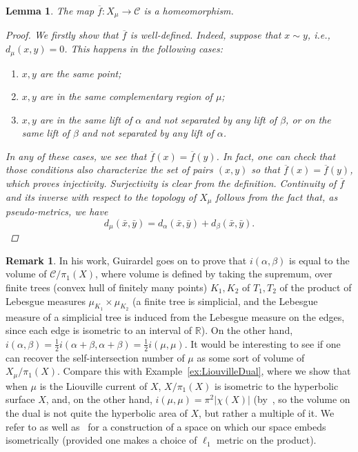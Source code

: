 \documentclass[12pt,article]{amsart}
\numberwithin{equation}{section}
\numberwithin{figure}{section}
\newtheorem{lemma}[equation]{Lemma}
\theoremstyle{definition}
\newtheorem{remark}[equation]{Remark}
\theoremstyle{plain}
\begin{document}
\begin{lemma}
    The map $\overline{f} : X_\mu \to \mathcal{C}$ is a homeomorphism. 
    \begin{proof}
        We firstly show that $\overline{f}$ is well-defined.
Indeed, suppose that $x \sim y$, i.e., $d_{\mu}(x,y)=0$.
This happens in the following cases:
\begin{enumerate}
\item $x,y$ are the same point;
\item $x,y$ are in the same complementary region of $\mu$;
\item $x,y$ are in the same lift of $\alpha$ and not separated by any lift of $\beta$, or on the same lift of $\beta$ and not separated by any lift of $\alpha$.
\end{enumerate}
In any of these cases, we see that $\overline{f}(x)=\overline{f}(y)$. 
In fact, one can check that those conditions also characterize the set of pairs $(x,y)$ so that $\overline{f}(x)=\overline{f}(y)$, which proves injectivity. Surjectivity is clear from the definition. Continuity of 
$\overline{f}$ and its inverse with respect to the topology of $X_{\mu}$ follows from the fact that, as pseudo-metrics, we have
\[
d_{\mu}(\bar{x},\bar{y})=d_{\alpha}(\bar{x},\bar{y}) + d_{\beta}(\bar{x},\bar{y}).
\]
    \end{proof}
\end{lemma}




\begin{remark}
In his work, Guirardel goes on to prove that $i(\alpha,\beta)$ is equal to the volume of $\mathcal{C}/\pi_1(X)$, where volume is defined by taking the supremum, over finite trees (convex hull of finitely many points) $K_1,K_2$ of $T_1,T_2$ of the product of Lebesgue measures $\mu_{K_1} \times \mu_{K_2}$ (a finite tree is simplicial, and the Lebesgue measure of a simplicial tree is induced from the Lebesgue measure on the edges, since each edge is isometric to an interval of $\mathbb{R}$). On the other hand, $i(\alpha,\beta)=\frac{1}{2}i(\alpha + \beta, \alpha + \beta)=\frac{1}{2} i(\mu,\mu)$. It would be interesting to see if one can recover the self-intersection number of $\mu$ as some sort of volume of $X_{\mu}/\pi_1(X)$. Compare this with Example~\ref{ex:LiouvilleDual}, where we show that when $\mu$ is the Liouville current of $X$, $X/\pi_1(X)$ is isometric to the hyperbolic surface $X$, and, on the other hand, $i(\mu,\mu)=\pi^2 |\chi(X)|$ (by~\cite[Proposition~15]{Bonahon88:GeodesicCurrent}, so the volume on the dual is not quite the hyperbolic area of $X$, but rather a multiple of it.
We refer to \cite[Definition~3.4]{BIPP21:PSL2xPSL2} as well as~\cite[Section~6.5]{O19:Energy} for a construction of a space on which our space embeds isometrically (provided one makes a choice of $\ell_1$ metric on the product).
\end{remark}
\end{document}
